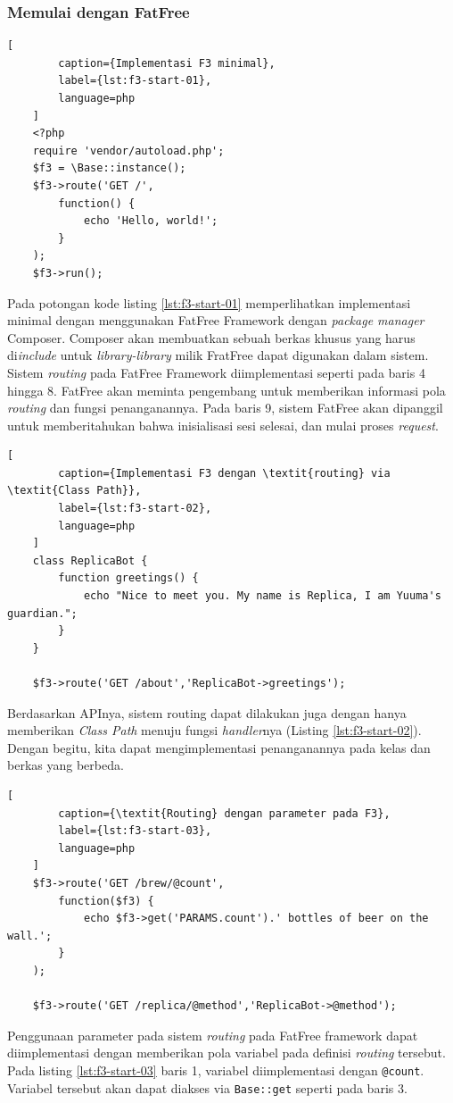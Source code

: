     \subsubsection{Memulai dengan FatFree}
    
    \begin{lstlisting}[
        caption={Implementasi F3 minimal},
        label={lst:f3-start-01},
        language=php
    ]
    <?php
    require 'vendor/autoload.php';
    $f3 = \Base::instance();
    $f3->route('GET /',
        function() {
            echo 'Hello, world!';
        }
    );
    $f3->run();
    \end{lstlisting}
    
    Pada potongan kode listing \ref{lst:f3-start-01} memperlihatkan implementasi minimal dengan menggunakan FatFree Framework dengan \textit{package manager} Composer. Composer akan membuatkan sebuah berkas khusus yang harus di\textit{include} untuk \textit{library-library} milik FratFree dapat digunakan dalam sistem.
    Sistem \textit{routing} pada FatFree Framework diimplementasi seperti pada baris 4 hingga 8. FatFree akan meminta pengembang untuk memberikan informasi pola \textit{routing} dan fungsi penanganannya.
    Pada baris 9, sistem FatFree akan dipanggil untuk memberitahukan bahwa inisialisasi sesi selesai, dan mulai proses \textit{request}.
    
    \begin{lstlisting}[
        caption={Implementasi F3 dengan \textit{routing} via \textit{Class Path}},
        label={lst:f3-start-02},
        language=php
    ]
    class ReplicaBot {
        function greetings() {
            echo "Nice to meet you. My name is Replica, I am Yuuma's guardian.";
        }
    }
    
    $f3->route('GET /about','ReplicaBot->greetings');
    \end{lstlisting}
    Berdasarkan APInya, sistem routing dapat dilakukan juga dengan hanya memberikan \textit{Class Path} menuju fungsi \textit{handler}nya (Listing \ref{lst:f3-start-02}). Dengan begitu, kita dapat mengimplementasi penanganannya pada kelas dan berkas yang berbeda.
    
    \begin{lstlisting}[
        caption={\textit{Routing} dengan parameter pada F3},
        label={lst:f3-start-03},
        language=php
    ]
    $f3->route('GET /brew/@count',
        function($f3) {
            echo $f3->get('PARAMS.count').' bottles of beer on the wall.';
        }
    );
    
    $f3->route('GET /replica/@method','ReplicaBot->@method');
    \end{lstlisting}
    Penggunaan parameter pada sistem \textit{routing} pada FatFree framework dapat diimplementasi dengan memberikan pola variabel pada definisi \textit{routing} tersebut. Pada listing \ref{lst:f3-start-03} baris 1, variabel diimplementasi dengan \texttt{@count}. Variabel tersebut akan dapat diakses via \texttt{Base::get} seperti pada baris 3.
    
